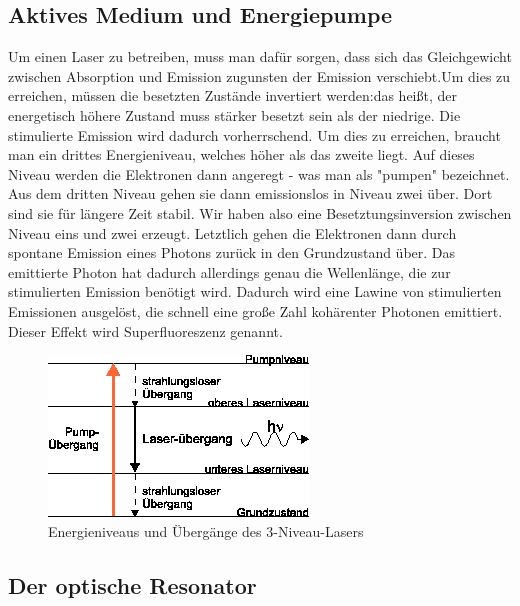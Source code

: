 \subsection{Aktives Medium und Energiepumpe}
Um einen Laser zu betreiben, muss man dafür sorgen, dass sich das Gleichgewicht zwischen Absorption und Emission zugunsten der Emission verschiebt.Um dies zu erreichen, müssen die besetzten Zustände invertiert werden:das heißt, der energetisch höhere Zustand muss stärker besetzt sein als der niedrige. Die  stimulierte Emission wird  dadurch vorherrschend. Um dies zu erreichen, braucht man ein drittes  Energieniveau, welches höher als das zweite liegt. Auf dieses Niveau werden die Elektronen dann angeregt - was man als "pumpen" bezeichnet.
Aus dem dritten Niveau gehen sie dann emissionslos in Niveau zwei über. Dort sind sie für längere Zeit stabil. Wir haben also eine Besetztungsinversion zwischen Niveau eins und zwei erzeugt. Letztlich  gehen die Elektronen dann durch spontane Emission eines Photons zurück in den Grundzustand über. Das emittierte Photon hat dadurch allerdings  genau die Wellenlänge, die zur stimulierten Emission benötigt wird.  Dadurch wird eine Lawine von stimulierten Emissionen ausgelöst, die  schnell eine große Zahl kohärenter Photonen emittiert. Dieser Effekt  wird Superfluoreszenz genannt.

\begin{figure}[h]
\begin{center}
\includegraphics[scale=0.9]{img/HNL4}
\caption{Energieniveaus und Übergänge des 3-Niveau-Lasers}
\end{center}
\end{figure}

\subsection{Der optische Resonator}

